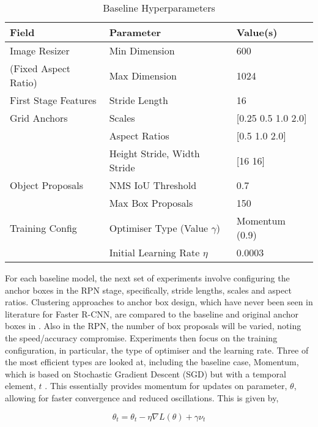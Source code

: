 \documentclass[journal]{IEEEtran}
\begin{document}
\begin{table}[H]
\begin{center}
\caption{Baseline Hyperparameters}\label{tab:baseline_params}
\begin{tabular}{lll}
\hline \hline
Field & Parameter & Value(s)\\
\hline \hline
Image Resizer & Min Dimension & 600 \\
\tiny{(Fixed Aspect Ratio)} & Max Dimension & 1024 \\
\hline
First Stage Features & Stride Length & 16 \\
\hline
Grid Anchors & Scales & [0.25 0.5 1.0 2.0] \\
 & Aspect Ratios & [0.5 1.0 2.0] \\
 & Height Stride, Width Stride & [16 16] \\
\hline
Object Proposals & NMS IoU Threshold & 0.7 \\
 & Max Box Proposals & 150 \\
\hline
Training Config & Optimiser Type (Value $\gamma$) & Momentum (0.9) \\
 & Initial Learning Rate $\eta$ & 0.0003 \\
\hline \hline
\end{tabular}
\end{center}
\end{table}

For each baseline model, the next set of experiments involve configuring the anchor boxes in the RPN stage, specifically, stride lengths, scales and aspect ratios. Clustering approaches to anchor box design, which have never been seen in literature for Faster R-CNN, are compared to the baseline and original anchor boxes in \cite{fasterrcnn}. Also in the RPN, the number of box proposals will be varied, noting the speed/accuracy compromise. Experiments then focus on the training configuration, in particular, the type of optimiser and the learning rate. Three of the most efficient types are looked at, including the baseline case, Momentum, which is based on Stochastic Gradient Descent (SGD) but with a temporal element, $t$ \cite{optimiserreviewpaper}. This essentially provides momentum for updates on parameter, $\theta$, allowing for faster convergence and reduced oscillations. This is given by,

\begin{equation}
\theta_{t} = \theta_{t} - \eta\nabla L(\theta) + \gamma \nu_{t}
\label{eq:momentum}
\end{equation}
\end{document}
